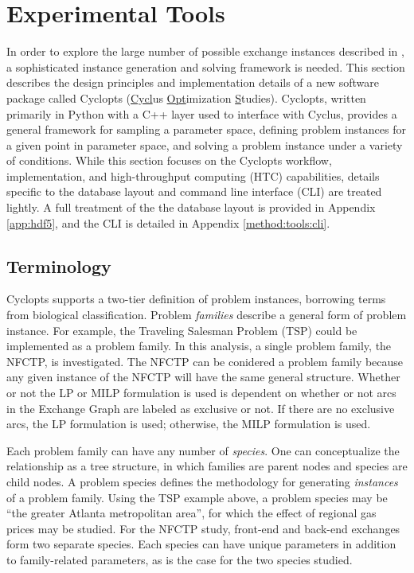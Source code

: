 
\section{Experimental Tools}\label{method:tools}

In order to explore the large number of possible exchange instances described in
, a sophisticated instance generation and solving framework
is needed. This section describes the design principles and implementation
details of a new software package called Cyclopts (\underline{Cycl}us
\underline{Opt}imization \underline{S}tudies). Cyclopts, written primarily in
Python with a C++ layer used to interface with Cyclus, provides a general
framework for sampling a parameter space, defining problem instances for a given
point in parameter space, and solving a problem instance under a variety of
conditions. While this section focuses on the Cyclopts workflow, implementation,
and high-throughput computing (HTC) capabilities, details specific to the
database layout and command line interface (CLI) are treated lightly. A full
treatment of the the database layout is provided in Appendix \ref{app:hdf5}, and
the CLI is detailed in Appendix \ref{method:tools:cli}.

\subsection{Terminology}\label{method:tools:term}

Cyclopts supports a two-tier definition of problem instances, borrowing terms
from biological classification. Problem \textit{families} describe a general
form of problem instance. For example, the Traveling Salesman Problem (TSP)
could be implemented as a problem family. In this analysis, a single problem
family, the NFCTP, is investigated. The NFCTP can be conidered a problem family
because any given instance of the NFCTP will have the same general
structure. Whether or not the LP or MILP formulation is used is dependent on
whether or not arcs in the Exchange Graph are labeled as exclusive or not. If
there are no exclusive arcs, the LP formulation is used; otherwise, the MILP
formulation is used.

Each problem family can have any number of \textit{species}. One can
conceptualize the relationship as a tree structure, in which families are parent
nodes and species are child nodes. A problem species defines the methodology for
generating \textit{instances} of a problem family. Using the TSP example above,
a problem species may be ``the greater Atlanta metropolitan area'', for which
the effect of regional gas prices may be studied. For the NFCTP study, front-end
and back-end exchanges form two separate species. Each species can have unique
parameters in addition to family-related parameters, as is the case for the two
species studied.

